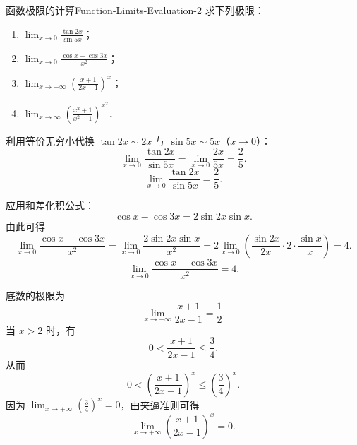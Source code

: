 \begin{problem}{函数极限的计算}{Function-Limits-Evaluation-2}
    求下列极限：
    \begin{enumerate}
        \item $\lim_{x\to 0} \frac{\tan 2x}{\sin 5x}$；
        \item $\lim_{x\to 0} \frac{\cos x - \cos 3x}{x^2}$；
        \item $\lim_{x\to +\infty} \left( \frac{x+1}{2x-1} \right)^x$；
        \item $\lim_{x\to\infty} \left( \frac{x^2+1}{x^2-1} \right)^{x^2}$．
    \end{enumerate}
\end{problem}

\begin{solution}

    利用等价无穷小代换 $\tan 2x \sim 2x$ 与 $\sin 5x \sim 5x$（$x \to 0$）：
    \begin{equation}
        \lim_{x\to 0} \frac{\tan 2x}{\sin 5x} = \lim_{x\to 0} \frac{2x}{5x} = \frac{2}{5}.
    \end{equation}
    \begin{equation}
        \boxed{\lim_{x\to 0} \frac{\tan 2x}{\sin 5x} = \frac{2}{5}.}
    \end{equation}


    应用和差化积公式：
    \begin{equation}
        \cos x - \cos 3x = 2 \sin 2x \sin x.
    \end{equation}
    由此可得
    \begin{equation}
        \lim_{x\to 0} \frac{\cos x - \cos 3x}{x^2} = \lim_{x\to 0} \frac{2 \sin 2x \sin x}{x^2} = 2 \lim_{x\to 0} \left( \frac{\sin 2x}{2x} \cdot 2 \cdot \frac{\sin x}{x} \right) = 4.
    \end{equation}
    \begin{equation}
        \boxed{\lim_{x\to 0} \frac{\cos x - \cos 3x}{x^2} = 4.}
    \end{equation}


    底数的极限为
    \begin{equation}
        \lim_{x\to +\infty} \frac{x+1}{2x-1} = \frac{1}{2}.
    \end{equation}
    当 $x > 2$ 时，有
    \begin{equation}
        0 < \frac{x+1}{2x-1} \leqslant \frac{3}{4}.
    \end{equation}
    从而
    \begin{equation}
        0 < \left( \frac{x+1}{2x-1} \right)^x \leqslant \left( \frac{3}{4} \right)^x.
    \end{equation}
    因为 $\lim_{x\to +\infty} \left(\frac{3}{4}\right)^x = 0$，由夹逼准则可得
    \begin{equation}
        \boxed{\lim_{x\to +\infty} \left( \frac{x+1}{2x-1} \right)^x = 0.}
    \end{equation}


\end{solution}
